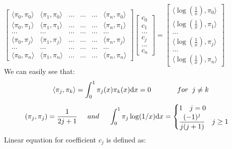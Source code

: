 \documentclass[14pt,a4paper]{article}
\begin{document}
\begin{enumerate}
	\hspace*{1cm} $\begin{bmatrix} \langle\pi_0,\pi_0\rangle & \langle\pi_1,\pi_0\rangle &...&...&...& \langle\pi_n,\pi_0\rangle \\ \langle\pi_0,\pi_1\rangle & \langle\pi_1,\pi_1\rangle &...&...&...& \langle\pi_n,\pi_1\rangle \\ ...&...&...&...&...&... \\ \langle\pi_0,\pi_j\rangle & \langle\pi_1,\pi_j\rangle &...&...&...& \langle\pi_n,\pi_j\rangle \\ ...&...&...&...&...&... \\ \langle\pi_0,\pi_n\rangle & \langle\pi_1,\pi_n\rangle &...&...&...& \langle\pi_n,\pi_n\rangle \end{bmatrix}  \begin{bmatrix} c_0 \\ c_1 \\ ...\\c_j\\... \\c_n \end{bmatrix} = \begin{bmatrix} \langle\log(\frac{1}{x}),\pi_0\rangle \\ \langle\log(\frac{1}{x}),\pi_1\rangle \\ ... \\\langle\log(\frac{1}{x}),\pi_j\rangle \\ ...\\ \langle\log(\frac{1}{x}),\pi_n\rangle \end{bmatrix} $\\
	We can easily see that: $$\langle\pi_j,\pi_k\rangle = \int_{0}^{1}\pi_j(x)\pi_k(x)\mathrm{d}x= 0 \hspace{1.3cm}  for \hspace{0.2cm} j\neq k$$
	$$ \left( \pi_j,\pi_j\right) = \dfrac{1}{2j+1} \hspace{0.5cm} and \hspace{0.5cm} \int_{0}^{1}\pi_j\log(1/x)\mathrm{d}x = \begin{cases} 1 \quad j = 0\\ \dfrac{(-1)^j}{j(j+1)} \quad j \geq 1 \end{cases} $$
	Linear equation for coefficient $c_j$ is defined as:\\

\end{enumerate}
\end{document}
